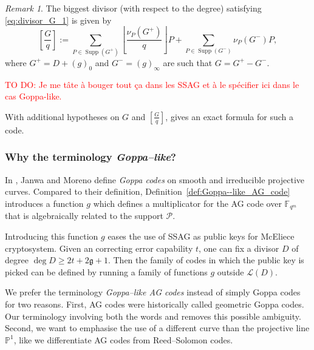 \documentclass[a4paper]{article}
\newtheorem{thm}{Theorem}[section]
\theoremstyle{definition}
\theoremstyle{remark}
\newtheorem{remark}[thm]{Remark}
\newcommand{\calP}{\mathcal{P}}
\newcommand{\calL}{\mathcal{L}}
\newcommand{\fqm}{\mathbb{F}_{q^m}}
\newcommand{\PP}{\mathbb{P}}
\newcommand{\Supp}{\operatorname{Supp}}
\newcommand\TODO[1]{\textcolor{red}{TO DO: #1}}
\begin{document}
\begin{remark}\label{rk:G/q}
The biggest divisor (with respect to the degree) satisfying \eqref{eq:divisor_G_1} is given by 
\begin{equation}\label{eq:G/q}
\left[ \frac{G}{q} \right]:= \sum\limits_{P \in \Supp(G^+)} \left\lfloor\frac{\nu_P(G^+)}{q}\right\rfloor P + \sum\limits_{P \in \Supp(G^-)}\nu_P(G^-)P,
\end{equation}
 where $G^+ = D+(g)_0$ and $G^-=(g)_\infty$ are such that $G=G^+-G^-$.
\end{remark}

\TODO{Je me tâte à bouger tout ça dans les SSAG et à le spécifier ici dans le cas Goppa-like.}

With additional hypotheses on $G$ and $\displaystyle \left[ \frac{G}{q} \right]$, {\cite[Theorem~1]{Le16}} gives an exact formula for such a code.

%	
%	

\subsubsection{Why the terminology \textit{Goppa--like}?}

In \cite{JM96}, Janwa and Moreno define \emph{Goppa codes} on smooth and irreducible projective curves. Compared to their definition, Definition~\ref{def:Goppa--like_AG_code} introduces a function $g$ which defines a multiplicator for the AG code over $\fqm$ that is algebraically related to the support $\calP$.

Introducing this function $g$ eases the use of SSAG as public keys for McEliece cryptosystem. Given an correcting error capability $t$, one can fix a divisor $D$ of degree $\deg D \geq 2t + 2\mathfrak{g}+1$. Then the family of codes in which the public key is picked can be defined by running a family of functions $g$ outside $\calL(D)$.

\medskip

We prefer the terminology \emph{Goppa--like AG codes} instead of simply Goppa codes for two reasons. First, AG codes were historically called geometric Goppa codes. Our terminology involving both the words  and  removes this possible ambiguity. Second, we want to emphasise the use of a different curve than the projective line $\PP^1$, like we differentiate AG codes from Reed--Solomon codes.
\end{document}
